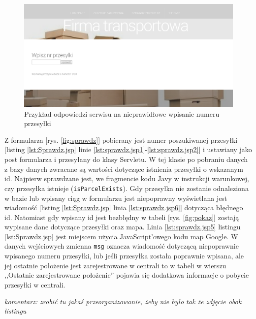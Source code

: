 \documentclass[eng,printmode,oneside]{mgr}
\begin{document}
\begin{figure}[ht!]
\centering
\includegraphics[width=\textwidth]{nieMaPrzesylki.png}
\caption{Przykład odpowiedzi serwisu na nieprawidłowe wpisanie numeru przesyłki}
\label{fig:niema}
\end{figure}


Z formularza [rys. \ref{fig:sprawdz}] pobierany jest numer poszukiwanej
przesyłki [listing \ref{lst:Sprawdz.jsp} linie
\ref{lst:sprawdz.jsp1}-\ref{lst:sprawdz.jsp2}] i ustawiany jako post formularza
i przesyłany do klasy Servletu. W tej klasie po pobraniu danych z bazy danych
zwracane są wartości dotyczące istnienia przesyłki o wskazanym id. Najpierw
sprawdzane jest, we fragmencie kodu Javy w instrukcji warunkowej, czy przesyłka
istnieje (\texttt{isParcelExists}). Gdy przesyłka nie zostanie odnaleziona w
bazie lub wpisany ciąg w formularzu jest niepoprawny wyświetlana jest wiadomość
[listing \ref{lst:Sprawdz.jsp} linia \ref{lst:sprawdz.jsp6}] dotycząca błędnego
id. Natomiast gdy wpisany id jest bezbłędny w tabeli [rys.
\ref{fig:pokaz}] zostają wypisane dane dotyczące przesyłki oraz mapa. Linia
\ref{lst:sprawdz.jsp5} listingu \ref{lst:Sprawdz.jsp} jest miejscem użycia
JavaScript'owego kodu map Google. W danych wejściowych zmienna \texttt{msg}
oznacza wiadomość dotyczącą niepoprawnie wpisanego numeru przesyłki, lub jeśli
przesyłka została poprawnie wpisana, ale jej ostatnie położenie jest
zarejestrowane w centrali to w tabeli w wierszu ,,Ostatnie zarejestrowane
położenie'' pojawia się dodatkowa informacje o pobycie przesyłki w centrali.

\emph{\color{komentarz}komentarz: zrobić tu jakaś przeorganizowanie, żeby nie
było tak że zdjęcie obok listingu}
\end{document}
